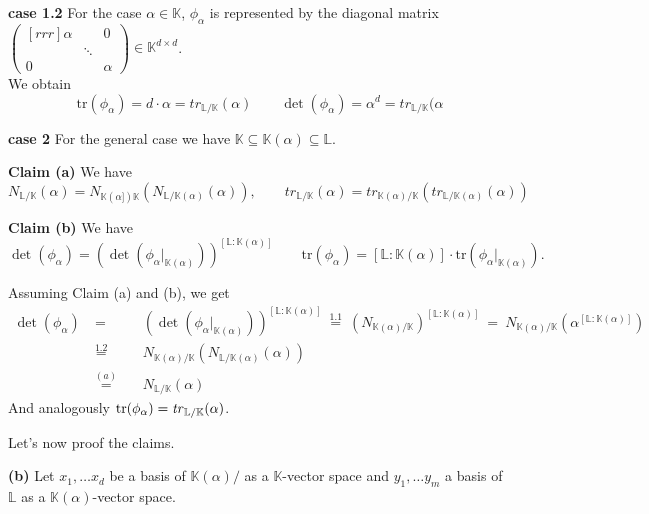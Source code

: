 \documentclass[12pt]{book}
\begin{document}
\begin{spacing}{1.3}
\begin{compactitem}
\item[\textbf{case 1.2}] For the case $\alpha \in \mathbb{K}$, $\phi_{\alpha}$ is represented by the diagonal matrix $\begin{pmatrix}[rrr] \alpha & & 0 \\ & \ddots & \\ 0 & & \alpha \end{pmatrix} \in \mathbb{K}^{d \times d}$.
\\ We obtain 
$$\textrm{tr}(\phi_{\alpha})=d \cdot \alpha = tr_{\mathbb{L}/\mathbb{K}}(\alpha) \qquad \det(\phi_{\alpha})=\alpha^d = tr_{\mathbb{L}/\mathbb{K}}(\alpha$$
\item[\textbf{case 2}] For the general case we have $\mathbb{K}\subseteq \mathbb{K}(\alpha) \subseteq \mathbb{L}$.\\
\begin{compactitem}
\item[\textbf{Claim (a)}] We have $$N_{\mathbb{L}/\mathbb{K}}(\alpha)=N_{\mathbb{K}(\alpha])\mathbb{K}} \left(N_{\mathbb{L}/\mathbb{K}(\alpha)}(\alpha)\right), \qquad tr_{\mathbb{L}/\mathbb{K}}(\alpha)=tr_{\mathbb{K}(\alpha)/\mathbb{K}}\left(tr_{\mathbb{L}/\mathbb{K}(\alpha)}(\alpha)\right)$$
\item[\textbf{Claim (b)}]  We have 
$$\det(\phi_{\alpha})=\left(\det\left(\phi_{\alpha}|_{\mathbb{K}(\alpha)}\right)\right)^{[\mathbb{L}:\mathbb{K}(\alpha)]} \qquad \textrm{tr}(\phi_{\alpha})=[\mathbb{L}:\mathbb{K}(\alpha)] \cdot \textrm{tr}\left(\phi_{\alpha}|_{\mathbb{K}(\alpha)}\right).$$
\end{compactitem}
Assuming Claim (a) and (b), we get
\begin{alignat*}{5}
\det(\phi_{\alpha})\ &=&&\ \left(\det\left(\phi_{\alpha}|_{\mathbb{K}(\alpha)}\right)\right)^{[\mathbb{L}:\mathbb{K}(\alpha)]} \ \overset{1.1}{=}\ \left(N_{\mathbb{K}(\alpha)/\mathbb{K}}\right)^{[\mathbb{L}:\mathbb{K}(\alpha)]}\ =\ N_{\mathbb{K}(\alpha)/\mathbb{K}}\left(\alpha^{[\mathbb{L}:\mathbb{K}(\alpha)]}\right)\\
\ &\overset{1.2}{=}&&\ N_{\mathbb{K}(\alpha)/\mathbb{K}}\left(N_{\mathbb{L}/\mathbb{K}(\alpha)}(\alpha)\right)\\
\ &\overset{(a)}{=}&&\ N_{\mathbb{L}/\mathbb{K}}(\alpha)
\end{alignat*}
And analogously
$\rm{tr}(\phi_{\alpha})= \it{tr}_{\mathbb{L}/\mathbb{K}}(\alpha)$.
\end{compactitem}
Let's now proof the claims.
\begin{compactitem}
\item[\textbf{(b)}]  Let $x_1, \ldots x_d$ be a basis of $\mathbb{K}(\alpha)/$ as a $\mathbb{K}$-vector space and $y_1, \ldots y_m$ a basis of $\mathbb{L}$ as a $\mathbb{K}(\alpha)$-vector space.\\

\end{compactitem}
\end{spacing}
\end{document}
